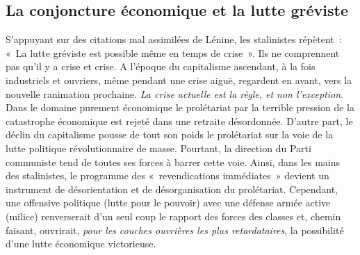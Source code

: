 \documentclass[french,twoside]{book} %
\begin{document}
\subsection[{La conjoncture économique et la lutte gréviste}]{La conjoncture économique et la lutte gréviste}
\noindent S’appuyant sur des citations mal assimilées de Lénine, les stalinistes répètent : « La lutte gréviste est possible même en temps de crise ». Ils ne comprennent pas qu’il y a crise et crise. A l’époque du capitalisme ascendant, à la fois industriels et ouvriers, même pendant une crise aiguë, regardent en avant, vers la nouvelle ranimation prochaine. \emph{La crise actuelle est la règle, et non l’exception}. Dans le domaine purement économique le prolétariat par la terrible pression de la catastrophe économique est rejeté dans une retraite désordonnée. D’autre part, le déclin du capitalisme pousse de tout son poids le prolétariat sur la voie de la lutte politique révolutionnaire de masse. Pourtant, la direction du Parti communiste tend de toutes ses forces à barrer cette voie. Ainsi, dans les mains des stalinistes, le programme des « revendications immédiates » devient un instrument de désorientation et de désorganisation du prolétariat. Cependant, une offensive politique (lutte pour le pouvoir) avec une défense armée active (milice) renverserait d’un seul coup le rapport des forces des classes et, chemin faisant, ouvrirait, \emph{pour les couches ouvrières les plus retardataires}, la possibilité d’une lutte économique victorieuse.
\end{document}
